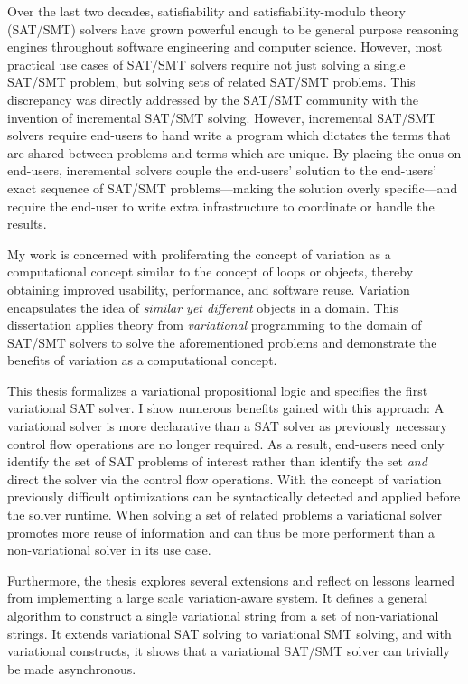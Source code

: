 Over the last two decades, satisfiability and satisfiability-modulo theory
(SAT/SMT) solvers have grown powerful enough to be general purpose reasoning
engines throughout software engineering and computer science. However, most
practical use cases of SAT/SMT solvers require not just solving a single SAT/SMT
problem, but solving sets of related SAT/SMT problems. This discrepancy was
directly addressed by the SAT/SMT community with the invention of incremental
SAT/SMT solving. However, incremental SAT/SMT solvers require end-users to hand
write a program which dictates the terms that are shared between problems and
terms which are unique. By placing the onus on end-users, incremental solvers
couple the end-users' solution to the end-users' exact sequence of SAT/SMT
problems---making the solution overly specific---and require the end-user to
write extra infrastructure to coordinate or handle the results.

My work is concerned with proliferating the concept of variation as a
computational concept similar to the concept of loops or objects, thereby
obtaining improved usability, performance, and software reuse. Variation
encapsulates the idea of \emph{similar yet different} objects in a domain. This
dissertation applies theory from \emph{variational} programming to the domain of
SAT/SMT solvers to solve the aforementioned problems and demonstrate the
benefits of variation as a computational concept.

This thesis formalizes a variational propositional logic and specifies the first
variational SAT solver. I show numerous benefits gained with this approach:
%
A variational solver is more declarative than a SAT solver as previously
necessary control flow operations are no longer required.
%
As a result, end-users need only identify the set of SAT problems of interest
rather than identify the set \emph{and} direct the solver via the control flow
operations.
%
With the concept of variation previously difficult optimizations can be
syntactically detected and applied before the solver runtime.
%
When solving a set of related problems a variational solver promotes more reuse
of information and can thus be more performent than a non-variational solver in
its use case.

Furthermore, the thesis explores several extensions and
reflect on lessons learned from implementing a large scale variation-aware
system. It defines a general algorithm to construct a single variational string
from a set of non-variational strings. It extends variational SAT solving to
variational SMT solving, and with variational constructs, it shows that a
variational SAT/SMT solver can trivially  be made asynchronous.

